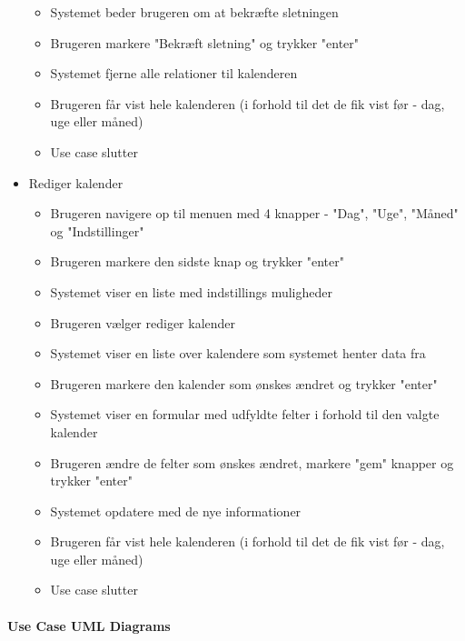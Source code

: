 \documentclass{article}
\begin{document}
\begin{itemize}
\begin{itemize}
   \item Systemet beder brugeren om at bekræfte sletningen
   \item Brugeren markere "Bekræft sletning" og trykker "enter"
   \item Systemet fjerne alle relationer til kalenderen
   \item Brugeren får vist hele kalenderen (i forhold til det de fik vist før - dag, uge eller måned)
   \item Use case slutter
   \end{itemize}
   \item Rediger kalender
   \begin{itemize}
   \item Brugeren navigere op til menuen med 4 knapper - "Dag", "Uge", "Måned" og "Indstillinger"
   \item Brugeren markere den sidste knap og trykker "enter"
   \item Systemet viser en liste med indstillings muligheder
   \item Brugeren vælger rediger kalender
   \item Systemet viser en liste over kalendere som systemet henter data fra
   \item Brugeren markere den kalender som ønskes ændret og trykker "enter"
   \item Systemet viser en formular med udfyldte felter i forhold til den valgte kalender
   \item Brugeren ændre de felter som ønskes ændret, markere "gem" knapper og trykker "enter"
   \item Systemet opdatere med de nye informationer
   \item Brugeren får vist hele kalenderen (i forhold til det de fik vist før - dag, uge eller måned)
   \item Use case slutter
   \end{itemize}
   \end{itemize}
   
   \newpage 
   \paragraph{Use Case UML Diagrams} \mbox{}
\end{document}
